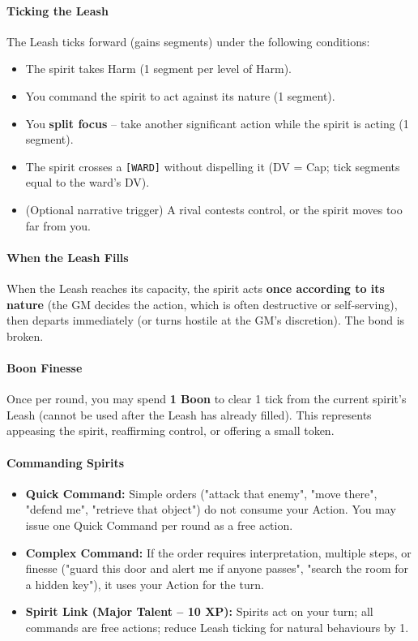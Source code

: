 \paragraph{Ticking the Leash}
The Leash ticks forward (gains segments) under the following conditions:
\begin{itemize}
  \item The spirit takes Harm (1 segment per level of Harm).
  \item You command the spirit to act against its nature (1 segment).
  \item You \textbf{split focus} -- take another significant action while the spirit is acting (1 segment).
  \item The spirit crosses a \texttt{[WARD]} without dispelling it (DV = Cap; tick segments equal to the ward's DV).
  \item (Optional narrative trigger) A rival contests control, or the spirit moves too far from you.
\end{itemize}

\paragraph{When the Leash Fills}
When the Leash reaches its capacity, the spirit acts \textbf{once according to its nature} (the GM decides the action, which is often destructive or self‑serving), then departs immediately (or turns hostile at the GM's discretion). The bond is broken.

\paragraph{Boon Finesse}
Once per round, you may spend \textbf{1 Boon} to clear 1 tick from the current spirit's Leash (cannot be used after the Leash has already filled). This represents appeasing the spirit, reaffirming control, or offering a small token.

\paragraph{Commanding Spirits}
\begin{itemize}
  \item \textbf{Quick Command:} Simple orders ("attack that enemy", "move there", "defend me", "retrieve that object") do not consume your Action. You may issue one Quick Command per round as a free action.
  \item \textbf{Complex Command:} If the order requires interpretation, multiple steps, or finesse ("guard this door and alert me if anyone passes", "search the room for a hidden key"), it uses your Action for the turn.
  \item \textbf{Spirit Link (Major Talent -- 10 XP):} Spirits act on your turn; all commands are free actions; reduce Leash ticking for natural behaviours by 1.
\end{itemize}

